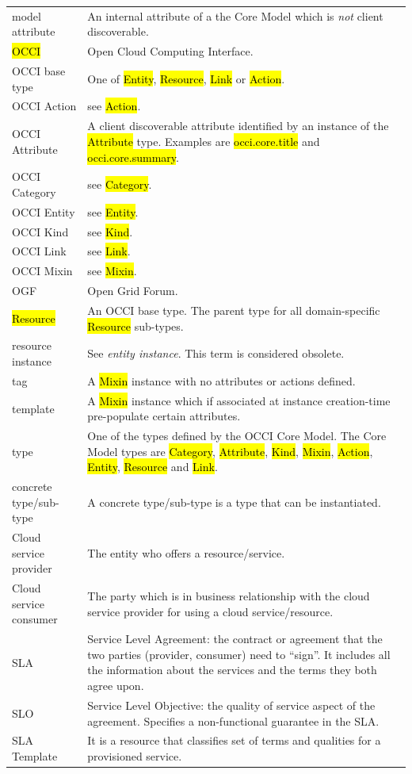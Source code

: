 \documentclass[10pt,a4paper]{article}
\begin{document}
\begin{tabular}{l|p{12cm}}
model attribute & An internal attribute of a the Core Model which is {\em not}
  client discoverable. \\

\hl{OCCI} & Open Cloud Computing Interface. \\

OCCI base type & One of \hl{Entity}, \hl{Resource}, \hl{Link} or \hl{Action}. \\

OCCI Action & see \hl{Action}. \\
OCCI Attribute & A client discoverable attribute identified by an instance of the \hl{Attribute} type. Examples are \hl{occi.core.title} and \hl{occi.core.summary}. \\
OCCI Category & see \hl{Category}. \\
OCCI Entity & see \hl{Entity}. \\
OCCI Kind & see \hl{Kind}. \\
OCCI Link & see \hl{Link}. \\
OCCI Mixin & see \hl{Mixin}. \\

OGF & Open Grid Forum. \\

\hl{Resource} & An OCCI base type. The parent type for all domain-specific \hl{Resource} sub-types. \\

resource instance & See {\em entity instance}. This term is considered obsolete. \\

tag & A \hl{Mixin} instance with no attributes or actions defined. \\

template & A \hl{Mixin} instance which if associated at instance
creation-time pre-populate certain attributes. \\

type & One of the types defined by the OCCI Core Model.  The Core Model types are
 \hl{Category}, \hl{Attribute},
 \hl{Kind}, \hl{Mixin}, \hl{Action}, \hl{Entity}, \hl{Resource}
 and \hl{Link}. \\

concrete type/sub-type & A concrete type/sub-type is a type that can be instantiated. \\

Cloud service provider & The entity who offers a resource/service. \\
Cloud service consumer & The party which is in business relationship with the cloud service provider for using a cloud service/resource. \\
SLA & Service Level Agreement: the contract or agreement that the two parties (provider, consumer) need to “sign”. It includes all the information about the services and the terms they both agree upon. \\
SLO & Service Level Objective: the quality of service aspect of the agreement. Specifies a non-functional guarantee in the SLA. \\
SLA Template & It is a resource that classifies set of terms and qualities for a provisioned service. \\
\end{tabular}
\end{document}
